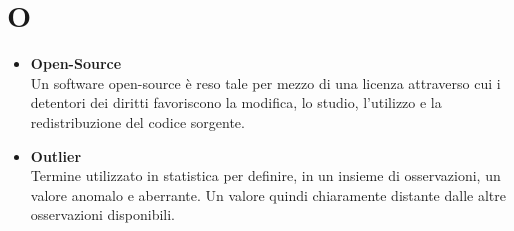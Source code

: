 \chapter{O} \label{O}
\begin{itemize}
	\item \textbf{Open-Source} \\
	Un software open-source è reso tale per mezzo di una licenza attraverso cui i detentori dei diritti favoriscono la modifica, lo studio, l'utilizzo e la redistribuzione del codice sorgente.
	
	\item \textbf{Outlier}\\
	Termine utilizzato in statistica per definire, in un insieme di osservazioni, un valore anomalo e aberrante. Un valore quindi chiaramente distante dalle altre osservazioni disponibili.
\end{itemize}